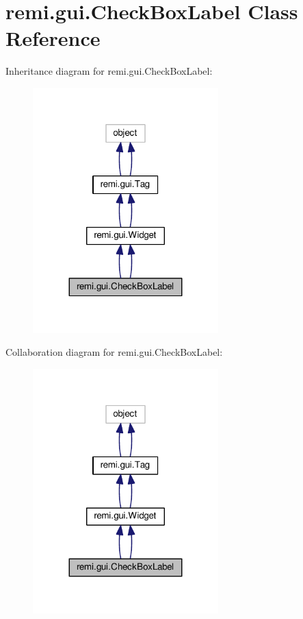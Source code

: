 \hypertarget{classremi_1_1gui_1_1CheckBoxLabel}{}\section{remi.\+gui.\+Check\+Box\+Label Class Reference}
\label{classremi_1_1gui_1_1CheckBoxLabel}


Inheritance diagram for remi.\+gui.\+Check\+Box\+Label\+:
\nopagebreak
\begin{figure}[H]
\begin{center}
\leavevmode
\includegraphics[width=203pt]{d4/d3c/classremi_1_1gui_1_1CheckBoxLabel__inherit__graph}
\end{center}
\end{figure}


Collaboration diagram for remi.\+gui.\+Check\+Box\+Label\+:
\nopagebreak
\begin{figure}[H]
\begin{center}
\leavevmode
\includegraphics[width=203pt]{dc/dba/classremi_1_1gui_1_1CheckBoxLabel__coll__graph}
\end{center}
\end{figure}
